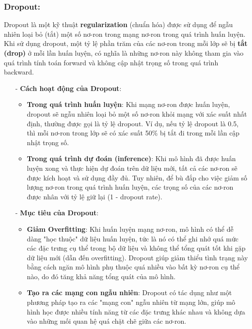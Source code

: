 \subsubsection{Dropout:}

Dropout là một kỹ thuật \textbf{regularization} (chuẩn hóa) được sử dụng để ngẫu nhiên loại bỏ (tắt) một số nơ-ron trong mạng nơ-ron trong quá trình huấn luyện. Khi sử dụng dropout, một tỷ lệ phần trăm của các nơ-ron trong mỗi lớp sẽ bị \textbf{tắt (drop)} ở mỗi lần huấn luyện, có nghĩa là những nơ-ron này không tham gia vào quá trình tính toán forward và không cập nhật trọng số trong quá trình backward.
\begin{enumerate}
    \item[-] \textbf{Cách hoạt động của Dropout}:
    \begin{itemize}
    \item \textbf{Trong quá trình huấn luyện}: Khi mạng nơ-ron được huấn luyện, dropout sẽ ngẫu nhiên loại bỏ một số nơ-ron khỏi mạng với xác suất nhất định, thường được gọi là tỷ lệ dropout. Ví dụ, nếu tỷ lệ dropout là 0.5, thì mỗi nơ-ron trong lớp sẽ có xác suất 50\% bị tắt đi trong mỗi lần cập nhật trọng số.
    \item \textbf{Trong quá trình dự đoán (inference)}: Khi mô hình đã được huấn luyện xong và thực hiện dự đoán trên dữ liệu mới, tất cả các nơ-ron sẽ được kích hoạt và sử dụng đầy đủ. Tuy nhiên, để bù đắp cho việc giảm số lượng nơ-ron trong quá trình huấn luyện, các trọng số của các nơ-ron được nhân với tỷ lệ giữ lại (1 - dropout rate).
    \end{itemize}
    \item[-] \textbf{Mục tiêu của Dropout}:
    \begin{itemize}
        \item \textbf{Giảm Overfitting}: Khi huấn luyện mạng nơ-ron, mô hình có thể dễ dàng "học thuộc" dữ liệu huấn luyện, tức là nó có thể ghi nhớ quá mức các đặc trưng cụ thể trong bộ dữ liệu và không thể tổng quát tốt khi gặp dữ liệu mới (dẫn đến overfitting). Dropout giúp giảm thiểu tình trạng này bằng cách ngăn mô hình phụ thuộc quá nhiều vào bất kỳ nơ-ron cụ thể nào, do đó tăng khả năng tổng quát của mô hình.
        \item \textbf{Tạo ra các mạng con ngẫu nhiên}: Dropout có tác dụng như một phương pháp tạo ra các "mạng con" ngẫu nhiên từ mạng lớn, giúp mô hình học được nhiều tính năng từ các đặc trưng khác nhau và không dựa vào những mối quan hệ quá chặt chẽ giữa các nơ-ron.
    \end{itemize}
\end{enumerate}

